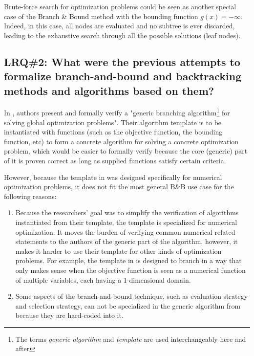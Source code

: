 Brute-force search for optimization problems could be seen as another special case of the
Branch \& Bound method with the bounding function $g(x) = -\infty$.
Indeed, in this case, all nodes are evaluated
and no subtree is ever discarded, leading to the exhaustive search through all the possible solutions
(leaf nodes).

\subsection{LRQ\#2: What were the previous attempts to formalize branch-and-bound and backtracking methods and algorithms based on them?}

In \cite{narkawicz2013formalnasa}, authors present and formally verify a "generic branching
algorithm\footnote{The terms \emph{generic algorithm} and \emph{template} are used interchangeably
                    here and after}
for solving global optimization problems". Their algorithm template is to be instantiated with
functions (such as the objective function, the bounding function, etc) to form a concrete
algorithm for solving a concrete optimization problem, which would be easier to formally verify
because the core (generic) part of it is proven correct as long as supplied functions
satisfy certain criteria.

However, because the template in \cite{narkawicz2013formalnasa} was designed specifically for
numerical optimization problems, it does not fit the most general B\&B use case for the following
reasons:

\begin{enumerate}
    \item Because the researchers' goal was to simplify the verification of algorithms instantiated
        from their template, the template is specialized for numerical optimization. It moves the
        burden of verifying common numerical-related statements to the authors of the generic
        part of the algorithm, however, it makes it harder to use their template for other kinds of
        optimization problems. For example, the template in \cite{narkawicz2013formalnasa}
        is designed to branch in a way that only makes sense when the objective function is seen as
        a numerical function of multiple variables, each having a 1-dimensional domain.
    \item Some aspects of the branch-and-bound technique, such as evaluation strategy
        and selection strategy, can not be specialized in the
        generic algorithm from \cite{narkawicz2013formalnasa} because they are hard-coded into it.
\end{enumerate}

